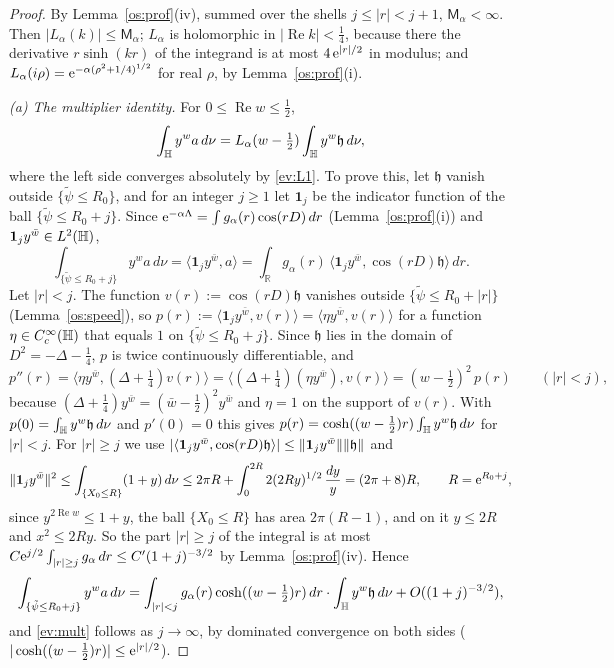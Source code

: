 \begin{proof}
By Lemma~\ref{os:prof}(iv), summed over the shells $j\le|r|<j+1$, $\mathsf M_\alpha<\infty$. Then $|L_\alpha(k)|\le \mathsf M_\alpha$; $L_\alpha$ is holomorphic in
$|\operatorname{Re}k|<\tfrac14$, because there the derivative $r\sinh(kr)$ of the integrand is at most $4\,\mathrm{e}^{|r|/2}$ in modulus; and
$L_\alpha(i\rho)=\mathrm{e}^{-\alpha(\rho^2+1/4)^{1/2}}$ for real $\rho$, by Lemma~\ref{os:prof}(i).

\emph{(a) The multiplier identity.} For $0\le\operatorname{Re}w\le\tfrac12$,
\begin{equation}\label{ev:mult}
  \int_{\mathbb{H}} y^wa\,d\nu=L_\alpha(w-\tfrac12)\int_{\mathbb{H}} y^w\mathfrak h\,d\nu ,
\end{equation}
where the left side converges absolutely by \eqref{ev:L1}. To prove this, let $\mathfrak h$ vanish outside $\{\tilde\psi\le R_0\}$, and for
an integer $j\ge1$ let $\mathbf 1_j$ be the indicator function of the ball $\{\tilde\psi\le R_0+j\}$. Since
$\mathrm{e}^{-\alpha\Lambda}=\int g_\alpha(r)\cos(rD)\,dr$ (Lemma~\ref{os:prof}(i)) and $\mathbf 1_jy^{\bar w}\in L^2(\mathbb{H})$,
\[
  \int_{\{\tilde\psi\le R_0+j\}}y^wa\,d\nu=\langle\mathbf 1_jy^{\bar w},a\rangle=\int_{\mathbb R}g_\alpha(r)\,\langle\mathbf 1_jy^{\bar w},\cos(rD)\mathfrak h\rangle\,dr .
\]
Let $|r|<j$. The function $v(r):=\cos(rD)\mathfrak h$ vanishes outside $\{\tilde\psi\le R_0+|r|\}$ (Lemma~\ref{os:speed}), so
$p(r):=\langle\mathbf 1_jy^{\bar w},v(r)\rangle=\langle\eta y^{\bar w},v(r)\rangle$ for a function $\eta\in C_c^\infty(\mathbb{H})$ that equals $1$ on $\{\tilde\psi\le R_0+j\}$. Since
$\mathfrak h$ lies in the domain of $D^2=-\Delta-\tfrac14$, $p$ is twice continuously differentiable, and
\[
  p''(r)=\langle\eta y^{\bar w},(\Delta+\tfrac14)v(r)\rangle=\langle(\Delta+\tfrac14)(\eta y^{\bar w}),v(r)\rangle=(w-\tfrac12)^2\,p(r)\qquad(|r|<j),
\]
because $(\Delta+\tfrac14)y^{\bar w}=(\bar w-\tfrac12)^2y^{\bar w}$ and $\eta=1$ on the support of $v(r)$. With $p(0)=\int_{\mathbb{H}} y^w\mathfrak h\,d\nu$ and $p'(0)=0$ this gives
$p(r)=\cosh((w-\tfrac12)r)\int_{\mathbb{H}} y^w\mathfrak h\,d\nu$ for $|r|<j$. For $|r|\ge j$ we use $|\langle\mathbf 1_jy^{\bar w},\cos(rD)\mathfrak h\rangle|\le\lVert \mathbf 1_jy^{\bar w}\rVert\lVert \mathfrak h\rVert$ and
\[
  \lVert \mathbf 1_jy^{\bar w}\rVert^2\le\int_{\{X_0\le R\}}(1+y)\,d\nu\le2\pi R+\int_0^{2R}2(2Ry)^{1/2}\,\frac{dy}{y}=(2\pi+8)R,\qquad R=\mathrm{e}^{R_0+j},
\]
since $y^{2\operatorname{Re}w}\le1+y$, the ball $\{X_0\le R\}$ has area $2\pi(R-1)$, and on it $y\le2R$ and $x^2\le2Ry$. So the part $|r|\ge j$ of
the integral is at most $C\mathrm{e}^{j/2}\int_{|r|\ge j}g_\alpha\,dr\le C'(1+j)^{-3/2}$ by Lemma~\ref{os:prof}(iv). Hence
\[
  \int_{\{\tilde\psi\le R_0+j\}}y^wa\,d\nu=\int_{|r|<j}g_\alpha(r)\cosh((w-\tfrac12)r)\,dr\cdot\int_{\mathbb{H}} y^w\mathfrak h\,d\nu+O((1+j)^{-3/2}),
\]
and \eqref{ev:mult} follows as $j\to\infty$, by dominated convergence on both sides ($|\cosh((w-\tfrac12)r)|\le\mathrm{e}^{|r|/2}$).


\end{proof}

